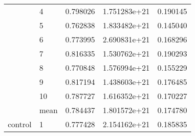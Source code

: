 \begin{tabular}{llrrr}
        & 4 &  0.798026 &  1.751283e+21 &  0.190145 \\
        & 5 &  0.762838 &  1.833482e+21 &  0.145040 \\
        & 6 &  0.773995 &  2.690831e+21 &  0.168296 \\
        & 7 &  0.816335 &  1.530762e+21 &  0.190293 \\
        & 8 &  0.770848 &  1.576994e+21 &  0.155229 \\
        & 9 &  0.817194 &  1.438603e+21 &  0.176485 \\
        & 10 &  0.787727 &  1.616352e+21 &  0.170227 \\
        \midrule
        & mean &  0.784437 &  1.801572e+21 &  0.174780 \\
    \midrule
    control & 1 &  0.777428 &  2.154162e+21 &  0.185835 \\
    \bottomrule
\end{tabular}
\endgroup
